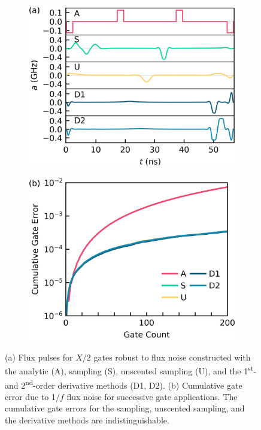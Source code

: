 \begin{figure}[ht]
  \begin{subfigure}{.4\textwidth}
    \includegraphics[width=\linewidth]{assets/f3a.png}
    \caption{}
    \label{fig:stochastica}
  \end{subfigure}\hspace{0.05\textwidth}
  \begin{subfigure}{.4\textwidth}
    \includegraphics[width=\linewidth]{assets/f3b.png}
        \caption{}
    \label{fig:stochasticb}
  \end{subfigure}
  \caption{
    (a) Flux pulses for $X/2$ gates robust to flux noise
    constructed with the analytic (A),
    sampling (S), unscented sampling (U), and the 1\textsuperscript{st}-
    and 2\textsuperscript{nd}-order derivative methods (D1, D2).
    (b) Cumulative gate error due to 1/$f$ flux noise for
    successive gate applications. The cumulative gate errors for the
    sampling, unscented sampling, and the derivative methods are indistinguishable.
  }
  \label{fig:stochastic}
\end{figure}

